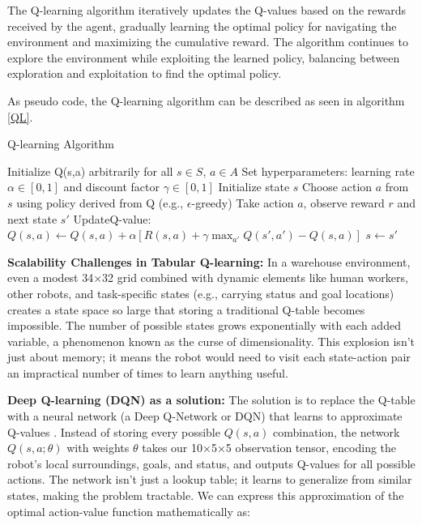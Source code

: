 \documentclass{kththesis}
\begin{document}
The Q-learning algorithm iteratively updates the Q-values based on the rewards received by the agent, gradually learning the optimal policy for navigating the environment and maximizing the cumulative reward. The algorithm continues to explore the environment while exploiting the learned policy, balancing between exploration and exploitation to find the optimal policy.

As pseudo code, the Q-learning algorithm can be described as seen in algorithm \ref{QL}.

\begin{algorithm}
\caption{Q-learning Algorithm}
\label{QL}
\begin{algorithmic}[1]
\State Initialize Q(s,a) arbitrarily for all $s \in S$, $a \in A$
\State Set hyperparameters: learning rate $\alpha \in [0,1]$ and discount factor $\gamma \in [0,1]$
    \State Initialize state $s$
        \State Choose action $a$ from $s$ using policy derived from Q (e.g., $\epsilon$-greedy)
        \State Take action $a$, observe reward $r$ and next state $s'$
        \State Update\hspace{0.1cm}Q-value: 
        \State $Q(s, a) \leftarrow Q(s, a) + \alpha \left[R(s, a) + \gamma \max_{a'} Q(s', a') - Q(s, a)\right]$
        \State $s \leftarrow s'$
    \EndWhile
\EndFor
\end{algorithmic}
\end{algorithm}

\textbf{Scalability Challenges in Tabular Q-learning:}
In a warehouse environment, even a modest 34×32 grid combined with dynamic elements like human workers, other robots, and task-specific states (e.g., carrying status and goal locations) creates a state space so large that storing a traditional Q-table becomes impossible. The number of possible states grows exponentially with each added variable, a phenomenon known as the curse of dimensionality. This explosion isn't just about memory; it means the robot would need to visit each state-action pair an impractical number of times to learn anything useful.

\textbf{Deep Q-learning (DQN) as a solution:}
The solution is to replace the Q-table with a neural network (a Deep Q-Network or DQN) that learns to approximate Q-values \parencite{mnih2013playing,mnih2015human}. Instead of storing every possible $Q(s,a)$ combination, the network $Q(s,a;\theta)$ with weights $\theta$ takes our 10×5×5 observation tensor, encoding the robot's local surroundings, goals, and status, and outputs Q-values for all possible actions. The network isn't just a lookup table; it learns to generalize from similar states, making the problem tractable. We can express this approximation of the optimal action-value function mathematically as:
\end{document}
